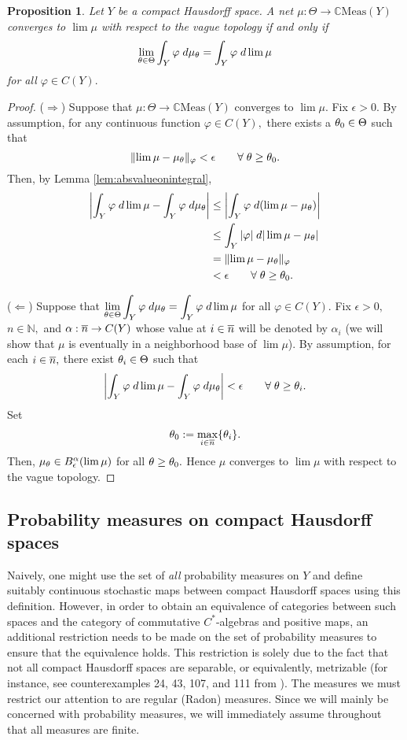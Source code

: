 \documentclass[12pt]{article}
\theoremstyle{theorem}
\newtheorem{proposition}[equation]{Proposition}
\theoremstyle{definition}
\numberwithin{equation}{section}
\let\a=\alpha \let\b=\beta \let\g=\gamma \let\de=\delta \let\e=\epsilon
\let\C=\Chi \let\W=\Omega
\def\vf{\varphi}
\newcommand{\be}{\begin{equation}}
\newcommand{\ee}{\end{equation}}
\newcommand{\bn}{\begin{proposition}}
\newcommand{\en}{\end{proposition}}
\newcommand{\bprf}{\begin{proof}}
\newcommand{\eprf}{\end{proof}}
\newcommand{\<}{\langle}
\renewcommand{\>}{\rangle}
\def\C{{{\mathbb C}}}
\def\N{{{\mathbb N}}}
\newcommand{\ds}{\displaystyle}
\begin{document}
\bn
Let $Y$ be a compact Hausdorff space.
A net $\mu:\Theta\to\C\mathrm{Meas}(Y)$ converges to $\lim\mu$ 
with respect to the vague topology if and only if 
\be
\lim_{\q\in\Theta}\int_{Y}\vf\;d\mu_{\q}=\int_{Y}\vf\;d\lim\mu
\ee
for all $\vf\in C(Y).$ 
\en

\bprf
{\color{white}{space}}

\noindent
($\Rightarrow$)
Suppose that $\mu:\Theta\to\C\mathrm{Meas}(Y)$ converges to $\lim\mu.$ 
Fix $\e>0.$ By assumption, for any continuous function $\vf\in C(Y),$ 
there exists a $\theta_{0}\in\Theta$ such that 
\be
\lVert\lim\mu-\mu_{\q}\rVert_{\vf}<\e\qquad\forall\;\q\ge\q_{0}.
\ee
Then, by Lemma \ref{lem:absvalueonintegral}, 
\be
\begin{split}
\left|\int_{Y}\vf\;d\lim\mu-\int_{Y}\vf\;d\mu_{\q}\right|
&\le\left|\int_{Y}\vf\;d(\lim\mu-\mu_{\q})\right|\\
&\le\int_{Y}|\vf|\;d|\lim\mu-\mu_{\q}|\\
&=\lVert\lim\mu-\mu_{\q}\rVert_{\vf}\\
&<\e\qquad\forall\;\q\ge\q_{0}.
\end{split}
\ee

\noindent
($\Leftarrow$)
Suppose that $\ds\lim_{\q\in\Theta}\int_{Y}\vf\;d\mu_{\q}=\int_{Y}\vf\;d\lim\mu$ 
for all $\vf\in C(Y).$ Fix $\e>0,$ $n\in\N,$ and $\a:\ov{n}\to C(Y)$ whose value
at $i\in\overline{n}$ will be denoted by $\a_{i}$ (we will show that $\mu$ is eventually
in a neighborhood base of $\lim\mu$). By assumption, for each $i\in\overline{n},$ 
there exist $\theta_{i}\in\Theta$ such that 
\be
\left|\int_{Y}\vf\;d\lim\mu-\int_{Y}\vf\;d\mu_{\q}\right|<\e\qquad\forall\;\q\ge\q_{i}.
\ee
Set 
\be
\q_{0}:=\max_{i\in\ov{n}}\{\q_{i}\}.
\ee
Then, $\mu_{\q}\in B^{\a}_{\e}(\lim\mu)$ for all $\theta\ge\theta_{0}.$ 
Hence $\mu$ converges to $\lim\mu$ with respect to the vague topology.  
\eprf

\subsection{Probability measures on compact Hausdorff spaces}
\label{sec:probmeasoncHaus}

Naively, one might use the set of \emph{all} probability measures on $Y$
and define suitably continuous stochastic maps between compact 
Hausdorff spaces using this definition. 
However, in order to obtain an equivalence of categories between
such spaces and the category of commutative $C^*$-algebras and positive maps, 
an additional restriction needs to be made on the set of probability measures
to ensure that the equivalence holds. 
This restriction is solely due to the fact that not all compact Hausdorff
spaces are separable, or equivalently, metrizable
(for instance, see counterexamples 24, 43, 107, and 111 from \cite{StSe95}). 
The measures we must restrict our attention to are regular (Radon) measures. 
Since we will mainly be concerned with probability measures, 
we will immediately assume throughout that all measures are finite. 
\end{document}
